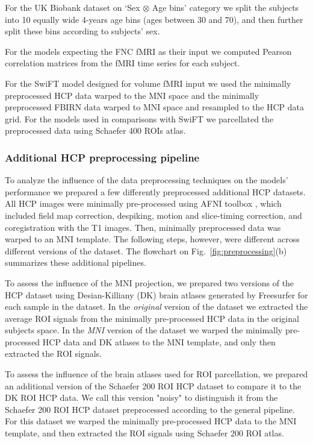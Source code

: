 \documentclass[final,5p,times,twocolumn,authoryear]{elsarticle}
\begin{document}
For the UK Biobank dataset on ‘Sex $\otimes$ Age bins’ category we split the subjects into 10 equally wide 4-years age bins (ages between 30 and 70), and then further split these bins according to subjects' sex.

For the models expecting the FNC fMRI as their input we computed Pearson correlation matrices from the fMRI time series for each subject.

For the SwiFT model designed for volume fMRI input we used the minimally preprocessed HCP data warped to the MNI space and the minimally preprocessed FBIRN data warped to MNI space and resampled to the HCP data grid. For the models used in comparisons with SwiFT we parcellated the preprocessed data using Schaefer 400 ROIs atlas.

\subsubsection{Additional HCP preprocessing pipeline}\label{sec:additional_datasets}

To analyze the influence of the data preprocessing techniques on the models’ performance we prepared a few differently preprocessed additional HCP datasets. All HCP images were minimally pre-processed using AFNI toolbox \citep{afni1, afni2}, which included field map correction, despiking, motion and slice-timing correction, and coregistration with the T1 images. Then, minimally preprocessed data was warped to an MNI template.
The following steps, however, were different across different versions of the dataset. The flowchart on Fig.~\ref{fig:preprocessing}(b) summarizes these additional pipelines.

To assess the influence of the MNI projection, we prepared two versions of the HCP dataset using Desian-Killiany (DK) brain atlases generated by Freesurfer for each sample in the dataset. In the \emph{original} version of the dataset we extracted the average ROI signals from the minimally pre-processed HCP data in the original subjects space. In the \emph{MNI} version of the dataset we warped the minimally pre-processed HCP data and DK atlases to the MNI template, and only then extracted the ROI signals.

To assess the influence of the brain atlases used for ROI parcellation, we prepared an additional version of the Schaefer 200 ROI HCP dataset to compare it to the DK ROI HCP data. We call this version "noisy" to distinguish it from the Schaefer 200 ROI HCP dataset preprocessed according to the general pipeline. For this dataset we warped the minimally pre-processed HCP data to the MNI template, and then extracted the ROI signals using Schaefer 200 ROI atlas.
\end{document}
